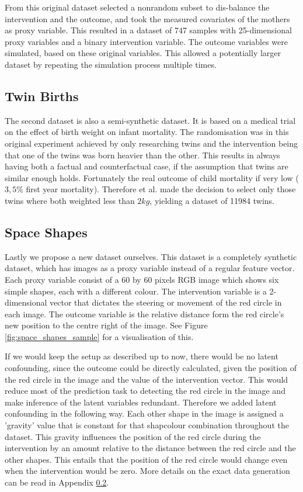 \documentclass{report}
\begin{document}
From this original dataset \cite{hill2011bayesian} selected a nonrandom subset to dis-balance the intervention and the outcome, and took the measured covariates of the mothers as proxy variable. This resulted in a dataset of 747 samples with 25-dimensional proxy variables and a binary intervention variable. The outcome variables were simulated, based on these original variables. This allowed a potentially larger dataset by repeating the simulation process multiple times.

\subsection{Twin Births}
The second dataset is also a semi-synthetic dataset. It is based on a medical trial on the effect of birth weight on infant mortality\cite{almond2005costs}. The randomisation was in this original experiment achieved by only researching twins and the intervention being that one of the twins was born heavier than the other. This results in always having both a factual and counterfactual case, if the assumption that twins are similar enough holds. Fortunately the real outcome of child mortality if very low ($3,5\%$ first year mortality). Therefore \cite{louizos2017causal} et al. made the decision to select only those twins where both weighted less than $2kg$, yielding a dataset of 11984 twins.

\subsection{Space Shapes}
Lastly we propose a new dataset ourselves. This dataset is a completely synthetic dataset, which has images as a proxy variable instead of a regular feature vector. Each proxy variable consist of a 60 by 60 pixels RGB image which shows six simple shapes, each with a different colour. The intervention variable is a 2-dimensional vector that dictates the steering or movement of the red circle in each image. The outcome variable is the relative distance form the red circle's new position to the centre right of the image. See Figure \ref{fig:space_shapes_sample} for a visualisation of this. 

If we would keep the setup as described up to now, there would be no latent confounding, since the outcome could be directly calculated, given the position of the red circle in the image and the value of the intervention vector. This would reduce most of the prediction task to detecting the red circle in the image and make inference of the latent variables redundant. Therefore we added latent confounding in the following way. Each other shape in the image is assigned a 'gravity' value that is constant for that shapcolour combination throughout the dataset. This gravity influences the position of the red circle during the intervention by an amount relative to the distance between the red circle and the other shapes. This entails that the position of the red circle would change even when the intervention would be zero. More details on the exact data generation can be read in Appendix \ref{}.
\end{document}
